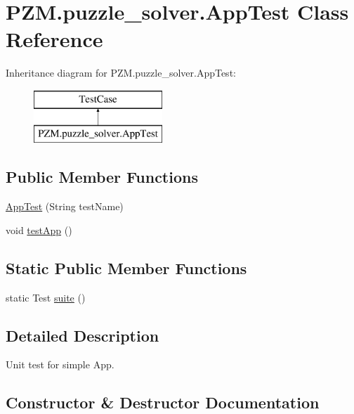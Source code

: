 \hypertarget{class_p_z_m_1_1puzzle__solver_1_1_app_test}{}\section{P\+Z\+M.\+puzzle\+\_\+solver.\+App\+Test Class Reference}
\label{class_p_z_m_1_1puzzle__solver_1_1_app_test}
Inheritance diagram for P\+Z\+M.\+puzzle\+\_\+solver.\+App\+Test\+:\begin{figure}[H]
\begin{center}
\leavevmode
\includegraphics[height=2.000000cm]{class_p_z_m_1_1puzzle__solver_1_1_app_test}
\end{center}
\end{figure}
\subsection*{Public Member Functions}
\begin{DoxyCompactItemize}
\item 
\hyperlink{class_p_z_m_1_1puzzle__solver_1_1_app_test_a7d590d954478869ebd271bdc87d28e3d}{App\+Test} (String test\+Name)
\item 
void \hyperlink{class_p_z_m_1_1puzzle__solver_1_1_app_test_adbdc8d9da9022bad47e1a9fc26c61361}{test\+App} ()
\end{DoxyCompactItemize}
\subsection*{Static Public Member Functions}
\begin{DoxyCompactItemize}
\item 
static Test \hyperlink{class_p_z_m_1_1puzzle__solver_1_1_app_test_afff2d4eeeefe140d3b87ef7bf9022cad}{suite} ()
\end{DoxyCompactItemize}


\subsection{Detailed Description}
Unit test for simple App. 

\subsection{Constructor \& Destructor Documentation}
\hypertarget{class_p_z_m_1_1puzzle__solver_1_1_app_test_a7d590d954478869ebd271bdc87d28e3d}{}\label{class_p_z_m_1_1puzzle__solver_1_1_app_test_a7d590d954478869ebd271bdc87d28e3d} 
